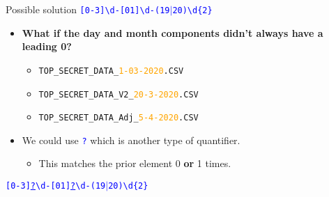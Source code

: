 \documentclass[
	usenames,
	dvipsnames,
	handout
] {beamer}
\newcommand{\reDigit}{\textbackslash{}d}
\newcommand{\rePattern}[1]{{\Large\texttt{\textcolor{blue}{#1}}}}
\begin{document}
\begin{frame}{Possible solution}
	\hspace*{3em}
	\rePattern{[0-3]\reDigit-[01]\reDigit-(19$|$20)\reDigit\{2\}}
		\pause
	\bigskip	
	\begin{itemize}[label=\textbullet]
		\item \textbf{What if the day and month components didn't always have a leading 0?}
		      \pause
		      \begin{itemize}[label=\textendash]
			      	\item \texttt{TOP\_SECRET\_DATA\_\textcolor{orange}{1-03-2020}.CSV}
			      	\item \texttt{TOP\_SECRET\_DATA\_V2\_\textcolor{orange}{20-3-2020}.CSV}
			      	\item \texttt{TOP\_SECRET\_DATA\_Adj\_\textcolor{orange}{5-4-2020}.CSV}
		      \end{itemize}
		      		\pause
		      \bigskip
		\item We could use \rePattern{?} which is another type of quantifier. \\
			\pause
		      \medskip		      
		      \begin{itemize}[label=\textendash]
		      		\item This matches the prior element 0 \textbf{or} 1 times.		      			
		      \end{itemize}
		      		\pause	      		      
	\end{itemize}
	
	\bigskip
      \hspace*{3em}
      \rePattern{[0-3]\underline{?}\reDigit-[01]\underline{?}\reDigit-(19$|$20)\reDigit\{2\}}
\end{frame}
    
\end{document}
